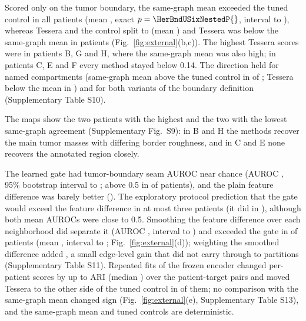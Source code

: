 \documentclass[11pt]{article}
\newcommand{\panelref}[2]{Fig.~\ref{#1}(#2)}
\begin{document}
Scored only on the tumor boundary, the same-graph mean exceeded the tuned control in all \HerPatients{} patients (mean \HerBndUSixNestedMean{}, exact \(p=\HerBndUSixNestedP{}\), interval \HerBndUSixNestedLo{} to \HerBndUSixNestedHi{}), whereas Tessera and the control split \HerBndTessNestedPos{} to \HerBndTessNestedNeg{} (mean \HerBndTessNestedMean{}) and Tessera was below the same-graph mean in \HerBndTessUSixNeg{} patients (\panelref{fig:external}{b,c}). The highest Tessera scores were in patients B, G and H, where the same-graph mean was also high; in patients C, E and F every method stayed below 0.14. The direction held for named compartments (same-graph mean above the tuned control in \HerCompUSixNestedPos{} of \HerPatients{}; Tessera below the mean in \HerCompTessUSixNeg{}) and for both variants of the boundary definition (Supplementary Table S10).

The maps show the two patients with the highest and the two with the lowest same-graph agreement (Supplementary Fig.~S9): in B and H the methods recover the main tumor masses with differing border roughness, and in C and E none recovers the annotated region closely.

The learned gate had tumor-boundary seam AUROC near chance (AUROC \HerBndSeamGate{}, 95\% bootstrap interval \HerBndSeamGateLo{} to \HerBndSeamGateHi{}; above 0.5 in \HerBndGateAboveChance{} of \HerPatients{} patients), and the plain feature difference was barely better (\HerBndSeamRaw{}). The exploratory protocol prediction that the gate would exceed the feature difference in at most three patients \HerHTwoVerdict{} (it did in \HerBndGateOverRaw{}), although both mean AUROCs were close to 0.5. Smoothing the feature difference over each neighborhood did separate it (AUROC \HerBndSeamSmooth{}, interval \HerBndSeamSmoothLo{} to \HerBndSeamSmoothHi{}) and exceeded the gate in \HerBndSeamSmoothGatePos{} of \HerPatients{} patients (mean \HerBndSeamSmoothGateMean{}, interval \HerBndSeamSmoothGateLo{} to \HerBndSeamSmoothGateHi{}; \panelref{fig:external}{d}); weighting the smoothed difference added \HerBndSeamSmoothPlainMean{}, a small edge-level gain that did not carry through to partitions (Supplementary Table S11). Repeated fits of the frozen encoder changed per-patient scores by up to \RepMaxRange{} ARI (median \RepMedianRange{}) over the \RepPairs{} patient-target pairs and moved Tessera to the other side of the tuned control in \RepSignChangesControl{} of them; no comparison with the same-graph mean changed sign (\panelref{fig:external}{e}, Supplementary Table S13), and the same-graph mean and tuned controls are deterministic.
\end{document}
